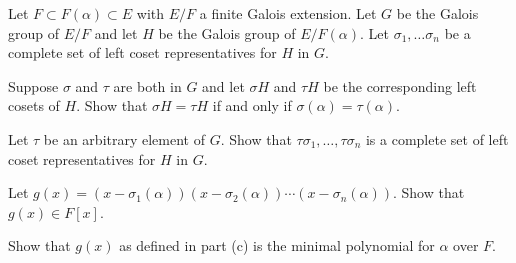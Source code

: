 Let $F\subset F(\alpha)\subset E$ with $E/F$ a finite Galois
extension. Let $G$ be the Galois group of $E/F$ and let $H$ be the
Galois group of $E/F(\alpha)$. Let $\sigma_1,\ldots \sigma_n$ be a
complete set of left coset representatives for $H$ in $G$.
\begin{alist}
\item Suppose $\sigma$ and $\tau$ are both in $G$ and let $\sigma H$
and $\tau H$ be the corresponding left cosets of $H$. Show that
$\sigma H = \tau H$ if and only if $\sigma(\alpha)=\tau(\alpha)$.
\item  Let $\tau$ be an arbitrary element of
$G$. Show that $\tau\sigma_1,\ldots ,\tau\sigma_{n}$ is a complete set
of left coset representatives for $H$ in $G$.
\item Let $g(x)=(x-\sigma_1(\alpha))(x-\sigma_2(\alpha))\cdots
(x-\sigma_n(\alpha))$. Show that $g(x)\in F[x]$.
\item Show that $g(x)$ as defined in part (c) is the minimal
polynomial for $\alpha$ over $F$. 
\end{alist}
